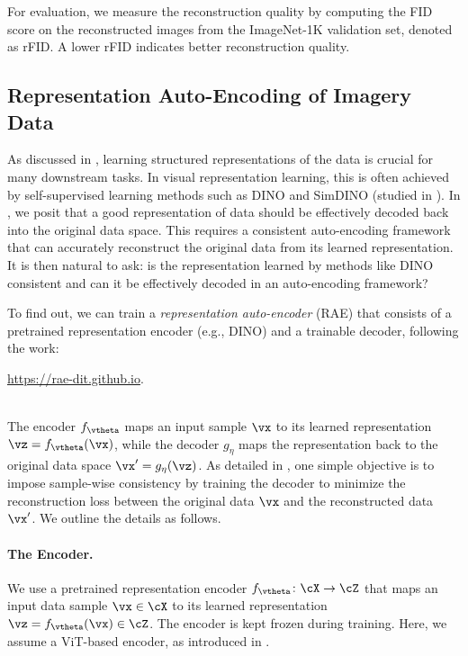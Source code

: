 \documentclass[../../book-main.tex]{subfiles}
\begin{document}
For evaluation, we measure the reconstruction quality by computing the FID score \citep{heusel2017gans} on the reconstructed images from the ImageNet-1K validation set, denoted as rFID.
A lower rFID indicates better reconstruction quality.

\subsection{Representation Auto-Encoding of Imagery Data}
\label{sec:RAE-implement}

\newcommand{\gc}[1]{\textcolor{deemph}{#1}}
\newcommand{\tablestyle}[2]{\setlength{\tabcolsep}{#1}\renewcommand{\arraystretch}{#2}\centering\scriptsize}

As discussed in , learning structured
representations of the data is crucial for many downstream tasks.
In
visual representation learning, this is often achieved by
self-supervised learning methods such as DINO
\citep{caron2021emerging} and SimDINO (studied in ).
In
, we posit
that a good representation of data should be effectively decoded back
into the original data space.
This requires a consistent
auto-encoding framework that can accurately reconstruct the original
data from its learned representation.
It is then natural to ask: is
the representation learned by methods like DINO consistent and can it
be effectively decoded in an auto-encoding framework?

To find out, we can train a \textit{representation auto-encoder}
(RAE) that consists of a pretrained representation encoder (e.g.,
DINO) and a trainable decoder, following the work:\\
\centerline{\url{https://rae-dit.github.io}.}\\
The encoder \(f_{\vtheta}\) maps an input sample
\(\vx\) to its learned representation \(\vz = f_{\vtheta}(\vx)\), while the decoder
\(g_{\eta}\) maps the representation back to the original data space
\(\vx' = g_{\eta}(\vz)\).
As detailed in , one simple
objective is to impose sample-wise consistency by training the
decoder to minimize the reconstruction loss between the original data
\(\vx\) and the reconstructed data \(\vx'\).
We outline the details as follows.

\paragraph{The Encoder.} We use a pretrained representation encoder
\(f_{\vtheta} \colon \cX \to \cZ\) that maps an input data sample \(\vx \in \cX\) to
its learned representation \(\vz = f_{\vtheta}(\vx) \in \cZ\).
The encoder is kept
frozen during training. Here, we assume a ViT-based encoder, as
introduced in .
\end{document}
